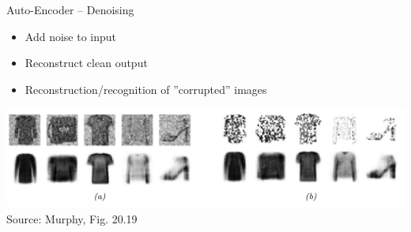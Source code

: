 \documentclass[ignorenonframetext,xcolor=x11names]{beamer}
\begin{document}
\begin{frame}{Auto-Encoder -- Denoising}
\begin{itemize}
   \item Add noise to input
   \item Reconstruct clean output
   \item Reconstruction/recognition of ''corrupted'' images
\end{itemize}
 
\begin{center}
\includegraphics[width=\textwidth]{murphy_20_19.png} \\

\scriptsize Source: Murphy, Fig. 20.19 \normalsize
\end{center}
\end{frame}
   
\end{document}

